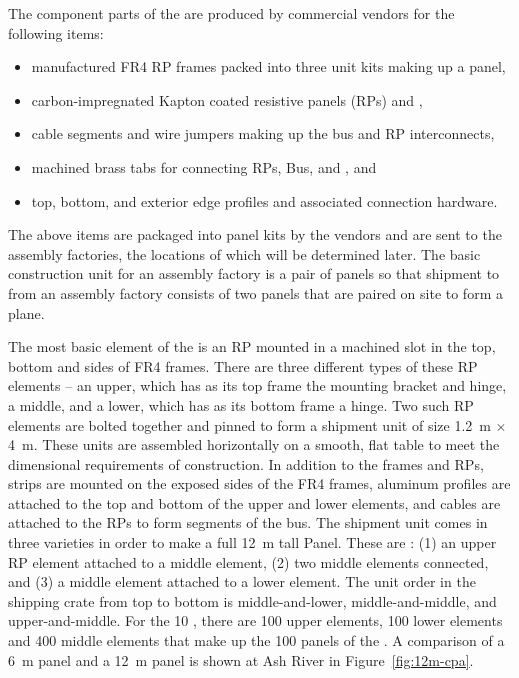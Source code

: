 The component parts of the  %
are produced by commercial vendors for the following items:
\begin{itemize}
\item manufactured FR4 RP frames packed into three  unit kits making up a  panel,
\item carbon-impregnated Kapton coated resistive panels (RPs) and ,
\item {} cable segments and wire jumpers making up the   bus and RP interconnects,
\item machined brass tabs for connecting RPs,  Bus, and , and
\item top, bottom, and exterior edge profiles and associated connection hardware.
\end{itemize}
The above items are packaged into  panel kits by the vendors and are sent to the assembly factories, the locations of which will be determined later.  The basic construction unit for an assembly factory is a pair of  panels so that shipment to \surf from an assembly factory consists of two  panels that are paired on site to form a  plane.

The most basic element of the  is an RP mounted in a machined slot in the top, bottom and sides of FR4 frames.  There are three different types of these  RP elements -- an upper, which has as its top frame the  mounting bracket and  hinge, a middle, and a lower, which has as its bottom frame a  hinge.  Two such  RP elements are bolted together and pinned to form a shipment  unit of size \SI{1.2}{\m} $\times$ \SI{4}{\m}.  These  units are assembled horizontally on a smooth, flat table to meet the dimensional requirements of  construction.  In addition to the frames and RPs, %
 strips are mounted on the exposed sides of the FR4 frames, aluminum profiles are attached to the top and bottom of the upper and lower elements, and cables are attached to the RPs to form segments of the  bus.  The shipment  unit comes in three varieties in order to make a full \SI{12}{\m} tall  Panel.  These are : (1) an upper  RP element attached to a middle element, (2) two middle elements connected, and (3) a middle element attached to a lower element.  The  unit order in the shipping crate from top to bottom is middle-and-lower, middle-and-middle, and upper-and-middle.  For the \SI{10}{\kt} , there are 100 upper elements, 100 lower elements and 400 middle elements that make up the 100  panels of the .
A comparison of a \SI{6}{\m}   panel and a \SI{12}{\m}  panel is shown at Ash River in Figure~\ref{fig:12m-cpa}.

